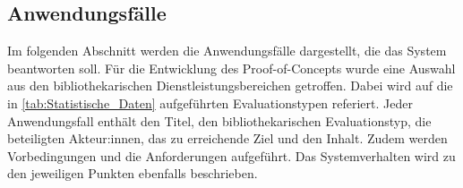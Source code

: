 


\subsection{Anwendungsfälle}
\label{chap:four_one_five}
Im folgenden Abschnitt werden die Anwendungsfälle dargestellt, die das System beantworten soll. Für die Entwicklung des Proof-of-Concepts wurde eine Auswahl aus den bibliothekarischen Dienstleistungsbereichen getroffen. 
Dabei wird auf die in \autoref{tab:Statistische_Daten} aufgeführten Evaluationstypen referiert.
Jeder Anwendungsfall enthält den Titel, den bibliothekarischen Evaluationstyp, die beteiligten Akteur:innen, das zu erreichende Ziel und
den Inhalt. Zudem werden Vorbedingungen und die Anforderungen aufgeführt.
Das Systemverhalten wird zu den jeweiligen Punkten ebenfalls beschrieben.


